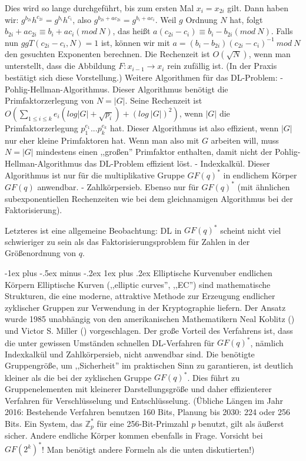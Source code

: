 \documentclass[a4paper]{article}
\makeatletter
\renewcommand{\subsubsection}{\@startsection{subsubsection}{3}{0mm}%
 {-1ex plus -.5ex minus -.2ex}%
 {1ex plus .2ex}%
 {\normalfont\small\bfseries}}
\makeatother
\begin{document}
\begin{multicols}{3}
    Dies wird so lange durchgeführt, bis zum ersten Mal $x_i=x_{2i}$ gilt. Dann haben wir: $g^{b_{2i}} h^{c_{2i}}=g^{b_i} h^{c_i}$, also $g^{b_{2i}+ac_{2i}}=g^{b_i+ac_i}$. Weil $g$ Ordnung $N$ hat, folgt $b_{2i} +ac_{2i}\equiv b_i+ac_i (mod\ N)$, das heißt $a(c_{2i}-c_i)\equiv b_i-b_{2i} (mod\ N)$.
    Falls nun $ggT(c_{2i}-c_i,N) = 1$ ist, können wir mit $a= (b_i-b_{2i})(c_{2i}-c_i)^{-1}\ mod\ N$ den gesuchten Exponenten berechnen.
    Die Rechenzeit ist $O(\sqrt{N})$, wenn man unterstellt, dass die Abbildung $F:x_{i-1}\rightarrow x_i$ rein zufällig ist. (In der Praxis bestätigt sich diese Vorstellung.)
    Weitere Algorithmen für das DL-Problem:
    - Pohlig-Hellman-Algorithmus. Dieser Algorithmus benötigt die Primfaktorzerlegung von $N=|G|$. Seine Rechenzeit ist $O(\sum_{1 \leq i\leq k} e_i(log|G|+\sqrt{p_i}) + (log\ |G|)^2)$, wenn $|G|$ die Primfaktorzerlegung $p^{e_1}_1... p^{e_k}_k$ hat. Dieser Algorithmus ist also effizient, wenn $|G|$ nur eher kleine Primfaktoren hat. Wenn man also mit $G$ arbeiten will, muss $N=|G|$ mindestens einen ,,großen'' Primfaktor enthalten, damit nicht der Pohlig-Hellman-Algorithmus das DL-Problem effizient löst.
    - Indexkalkül. Dieser Algorithmus ist nur für die multiplikative Gruppe $GF(q)^*$ in endlichem Körper $GF(q)$ anwendbar.
    - Zahlkörpersieb. Ebenso nur für $GF(q)^*$ (mit ähnlichen subexponentiellen Rechenzeiten wie bei dem gleichnamigen Algorithmus bei der Faktorisierung).

    Letzteres ist eine allgemeine Beobachtung: DL in $GF(q)^*$ scheint nicht viel schwieriger zu sein als das Faktorisierungsproblem für Zahlen in der Größenordnung von $q$.

    \subsubsection{Elliptische Kurvenuber endlichen Körpern}
    Elliptische Kurven (,,elliptic curves'', ,,EC'') sind mathematische Strukturen, die eine moderne, attraktive Methode zur Erzeugung endlicher zyklischer Gruppen zur Verwendung in der Kryptographie liefern. Der Ansatz wurde 1985 unabhängig von den amerikanischen Mathematikern Neal Koblitz () und Victor S. Miller () vorgeschlagen. Der große Vorteil des Verfahrens ist, dass die unter gewissen Umständen schnellen DL-Verfahren für $GF(q)^*$, nämlich Indexkalkül und Zahlkörpersieb, nicht anwendbar sind. Die benötigte Gruppengröße, um ,,Sicherheit'' im praktischen Sinn zu garantieren, ist deutlich kleiner als die bei der zyklischen Gruppe $GF(q)^*$. Dies führt zu Gruppenelementen mit kleinerer Darstellungsgröße und daher effizienterer Verfahren für Verschlüsselung und Entschlüsselung.
    (Übliche Längen im Jahr 2016: Bestehende Verfahren benutzen 160 Bits, Planung bis 2030: 224 oder 256 Bits. Ein System, das $\mathbb{Z}^*_p$ für eine 256-Bit-Primzahl $p$ benutzt, gilt als äußerst sicher. Andere endliche Körper kommen ebenfalls in Frage. Vorsicht bei $GF(2^k)^*$! Man benötigt andere Formeln als die unten diskutierten!)


\end{multicols}
\end{document}
